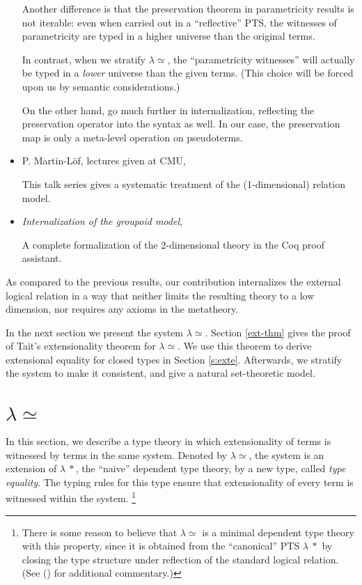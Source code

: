 \documentclass[10pt]{article}
\newcommand{\leeq}{\lambda {\eeq}}
\newcommand{\lext}{\lambda\mathpzc{e}}
\newcommand{\sta}{*}
\newcommand{\lstar}{{\lambda\!\!\:\sta}}
\newcommand{\eeq}{\simeq}
\renewcommand{\lext}{\leeq}
\begin{document}
\begin{itemize}
Another difference is that the preservation theorem in parametricity results
is not iterable: even when carried out in a ``reflective'' PTS, the
witnesses of parametricity are typed in a higher universe than the
original terms.

In contrast, when we stratify $\leeq$, the ``parametricity witnesses''
will actually be typed in a \emph{lower} universe than the given
terms. (This choice will be forced upon us by semantic considerations.)

On the other hand, \cite{intpar} go much further in internalization,
reflecting the preservation operator into the syntax as well.
In our case, the preservation
map is only a meta-level operation on pseudoterms.

\item 
P. Martin-L\"of, lectures given at CMU, \cite{perML}

This talk series gives a systematic treatment of the (1-dimensional) relation model.
\item
\emph{Internalization of the groupoid model}, \cite{matthiu}

A complete formalization of the 2-dimensional theory in the Coq proof assistant.
\end{itemize}

As compared to the previous results,
our contribution internalizes the
external logical relation
in a way that neither limits the resulting theory to a low
dimension, nor requires any axioms in the metatheory.


In the next section we present the system $\lext$.
Section \ref{ext-thm} gives the proof of
Tait's extensionality theorem for $\lext$.
We use this theorem to derive extensional equality for closed types
in Section \ref{s:exte}.
Afterwards, we stratify the system to make it consistent,
and give a natural set-theoretic model.

\section{$\lext$}
In this section, we describe a type theory in which
extensionality of terms is witnessed by terms in the same system.
Denoted by $\lext$, the system is an extension of $\lstar$, the ``naive''
dependent type theory, by a new type, called
\emph{type equality}.
The typing rules for this type ensure that extensionality of every term is witnessed
within the system.
\footnote{
There is some reason to believe that $\leeq$
is a minimal dependent type theory with this property,
since it is obtained from the ``canonical'' PTS $\lstar$
by closing the type structure under reflection of the standard
logical relation.  (See (\cite{ett1}) for additional commentary.)
}
\end{document}
